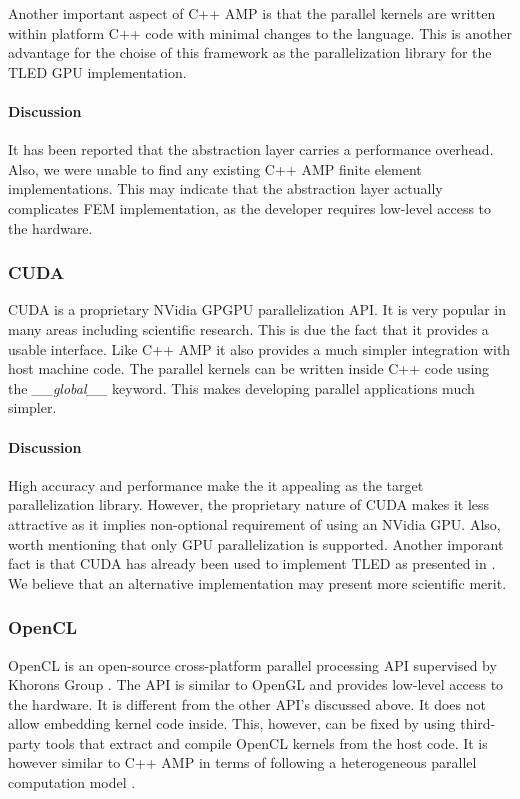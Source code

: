  Another important aspect of C++ AMP is that the parallel kernels are written within platform C++ code with minimal changes to the language. This is another advantage for the choise of this framework as the parallelization library for the TLED GPU implementation.

  \paragraph{Discussion} It has been reported \cite{Wong-perf:2010} that the abstraction layer carries a performance overhead. Also, we were unable to find any existing C++ AMP finite element implementations. This may indicate that the abstraction layer actually complicates FEM implementation, as the developer requires low-level access to the hardware.

  \subsubsection{CUDA}

  CUDA is a proprietary NVidia \cite{nvidia-cuda} GPGPU parallelization API. It is very popular in many areas including scientific research. This is due the fact that it provides a usable interface. Like C++ AMP it also provides a much simpler integration with host machine code. The parallel kernels can be written inside C++ code using the \textit{\_\_global\_\_} keyword. This makes developing parallel applications much simpler.

  \paragraph{Discussion}
  High accuracy and performance make the it appealing as the target parallelization library. However, the proprietary nature of CUDA makes it less attractive as it implies non-optional requirement of using an NVidia GPU. Also, worth mentioning that only GPU parallelization is supported. Another imporant fact is that CUDA has already been used to implement TLED as presented in \cite{Johnsen2014}. We believe that an alternative implementation may present more scientific merit.

  \subsubsection{OpenCL}

  OpenCL is an open-source cross-platform parallel processing API supervised by Khorons Group \cite{khronos-opencl}. The API is similar to OpenGL and provides low-level access to the hardware. It is different from the other API's discussed above. It does not allow embedding kernel code inside. This, however, can be fixed by using third-party tools \cite{Lawlor2003} that extract and compile OpenCL kernels from the host code. It is however similar to C++ AMP in terms of following a heterogeneous parallel computation model \cite{Stone2010}.

